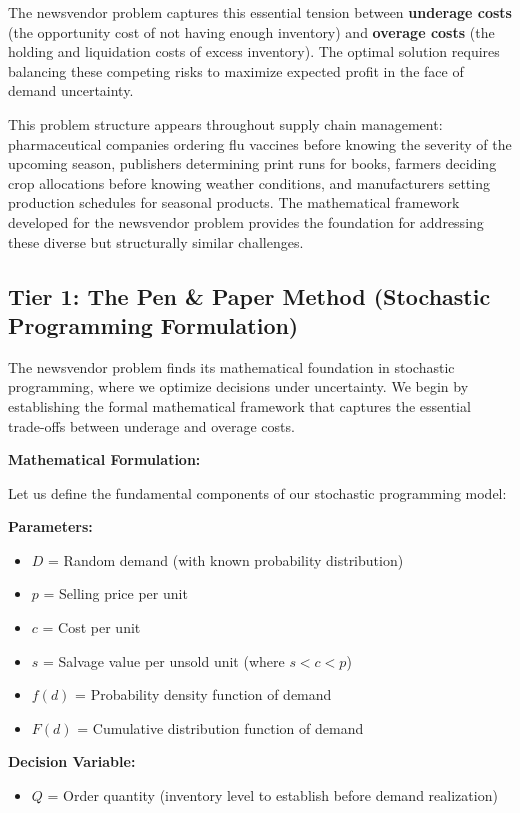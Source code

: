 \documentclass{article}
\begin{document}
The newsvendor problem captures this essential tension between \textbf{underage costs} (the opportunity cost of not having enough inventory) and \textbf{overage costs} (the holding and liquidation costs of excess inventory). The optimal solution requires balancing these competing risks to maximize expected profit in the face of demand uncertainty.

This problem structure appears throughout supply chain management: pharmaceutical companies ordering flu vaccines before knowing the severity of the upcoming season, publishers determining print runs for books, farmers deciding crop allocations before knowing weather conditions, and manufacturers setting production schedules for seasonal products. The mathematical framework developed for the newsvendor problem provides the foundation for addressing these diverse but structurally similar challenges.

\subsection{Tier 1: The Pen \& Paper Method (Stochastic Programming Formulation)}

The newsvendor problem finds its mathematical foundation in stochastic programming, where we optimize decisions under uncertainty. We begin by establishing the formal mathematical framework that captures the essential trade-offs between underage and overage costs.

\textbf{Mathematical Formulation:}

Let us define the fundamental components of our stochastic programming model:

\textbf{Parameters:}
\begin{itemize}
\item $D$ = Random demand (with known probability distribution)
\item $p$ = Selling price per unit
\item $c$ = Cost per unit
\item $s$ = Salvage value per unsold unit (where $s < c < p$)
\item $f(d)$ = Probability density function of demand
\item $F(d)$ = Cumulative distribution function of demand
\end{itemize}

\textbf{Decision Variable:}
\begin{itemize}
\item $Q$ = Order quantity (inventory level to establish before demand realization)
\end{itemize}
\end{document}
